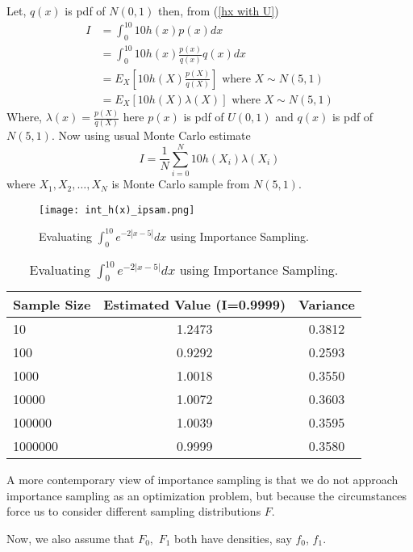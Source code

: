 \begin{example}
	Let, $q(x)$ is pdf of $N(0,1)$ then, from (\ref{hx with U})
	\begin{align*}
		I & = \int_{0}^{10} 10h(x) p(x) dx                                            \\
		  & = \int_{0}^{10} 10 h(x) \frac{p(x)}{q(x)} q(x)dx                          \\
		  & = E_X\left[ 10 h(X) \frac{p(X)}{q(X)} \right] \text{ where } X\sim N(5,1) \\
		  & = E_X\left[ 10 h(X) \lambda(X) \right]\text{ where } X\sim N(5,1)
	\end{align*}
	Where, $\lambda(x) = \frac{p(X)}{q(X)}$ here $p(x)$ is pdf of $U(0,1)$ and $q(x)$ is pdf of $N(5,1)$. Now using usual Monte Carlo estimate
	\[
		I = \frac{1}{N} \sum_{i = 0}^{N} 10 h(X_i) \lambda(X_i)
	\]
	where $X_1, X_2,\ldots,X_N$ is Monte Carlo sample from $N(5,1)$.
	\begin{figure}[H]
		\centering
		\texttt{[image: int\_h(x)\_ipsam.png]}
		\caption{Evaluating $\int_{0}^{10} e^{-2 |x-5|} dx$ using Importance Sampling.}
		\label{fig:impotrancesampling1}
	\end{figure}
	\begin{table}[h]
		\centering
		\begin{tabular}{lcc}
			\hline
			\textbf{Sample Size} & \textbf{Estimated Value (I=0.9999)} & \textbf{Variance} \\
			\hline
			10                   & 1.2473                              & 0.3812            \\
			100                  & 0.9292                              & 0.2593            \\
			1000                 & 1.0018                              & 0.3550            \\
			10000                & 1.0072                              & 0.3603            \\
			100000               & 1.0039                              & 0.3595            \\
			1000000              & 0.9999                              & 0.3580            \\
            \hline
		\end{tabular}
		\caption{Evaluating $\int_{0}^{10} e^{-2 |x-5|} dx$ using Importance Sampling.}
		\label{tab:mytable}
	\end{table}
\end{example}



A more contemporary view of importance sampling is that we do not approach
importance sampling as an optimization problem, but because the circumstances
force us to consider different sampling distributions $F$.

Now, we also assume that $F_0,$ $F_1$ both have densities, say $f_0$, $f_1$.

